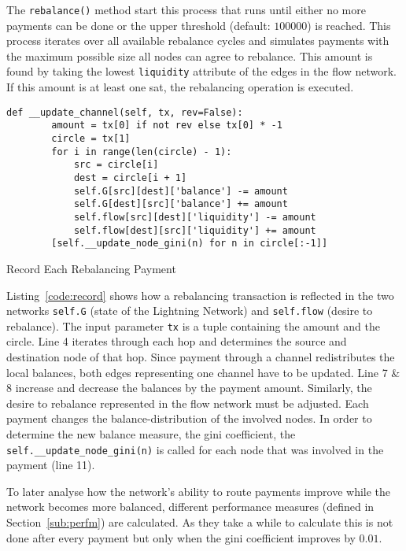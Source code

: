 \documentclass[final]{fhnwreport}       %
\begin{document}
The \texttt{rebalance()} method start this process that runs until either no more payments can be done or the upper threshold (default: $100000$) is reached. This process iterates over all available rebalance cycles and simulates payments with the maximum possible size all nodes can agree to rebalance. This amount is found by taking the lowest \texttt{liquidity} attribute of the edges in the flow network. If this amount is at least one sat, the rebalancing operation is executed. 

\begin{listing}[H]
  \begin{verbatim}
def __update_channel(self, tx, rev=False):
        amount = tx[0] if not rev else tx[0] * -1
        circle = tx[1]
        for i in range(len(circle) - 1):
            src = circle[i]
            dest = circle[i + 1]
            self.G[src][dest]['balance'] -= amount
            self.G[dest][src]['balance'] += amount
            self.flow[src][dest]['liquidity'] -= amount
            self.flow[dest][src]['liquidity'] += amount
        [self.__update_node_gini(n) for n in circle[:-1]]
  \end{verbatim}
  \caption{Record Each Rebalancing Payment}
  \label{code:record}
\end{listing}

Listing~\ref{code:record} shows how a rebalancing transaction is reflected in the two networks \texttt{self.G} (state of the Lightning Network) and \texttt{self.flow} (desire to rebalance). The input parameter \texttt{tx} is a tuple containing the amount and the circle. Line 4 iterates through each hop and determines the source and destination node of that hop. Since payment through a channel redistributes the local balances, both edges representing one channel have to be updated. Line 7 \& 8 increase and decrease the balances by the payment amount. Similarly, the desire to rebalance represented in the flow network must be adjusted. Each payment changes the balance-distribution of the involved nodes. In order to determine the new balance measure, the \gls{gini} coefficient, the \texttt{self.__update_node_gini(n)} is called for each node that was involved in the payment (line 11).

To later analyse how the network's ability to route payments improve while the network becomes more balanced, different performance measures (defined in Section~\ref{sub:perfm}) are calculated. As they take a while to calculate this is not done after every payment but only when the \gls{gini} coefficient improves by $0.01$.
\end{document}
